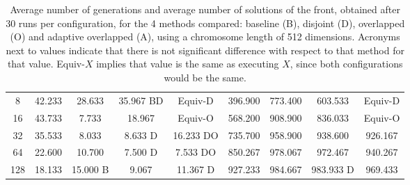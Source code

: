 \documentclass[preprint]{elsarticle}
\begin{document}
\begin{table*}
{\begin{tabular}{|c||c|c|c|c||c|c|c|c||}
8	&	42.233		&	28.633		&	35.967	BD		&	Equiv-D			&	396.900		&	773.400			&	603.533			&	Equiv-D				\\
16	&	43.733		&	7.733		&	18.967			&	Equiv-O			&	568.200		&	908.900			&	836.033			&	Equiv-O				\\
32	&	35.533		&	8.033		&	8.633	D		&	16.233		DO	&	735.700		&	958.900			&	938.600			&	926.167				\\
64	&	22.600		&	10.700		&	7.500	D		&	7.533		DO	&	850.267		&	978.067			&	972.467			&	940.267				\\
128	&	18.133		&	15.000	B	&	9.067			&	11.367		D	&	927.233		&	984.667			&	983.933	D		&	969.433				\\ \hline
\end{tabular}
}
\caption{Average number of generations and average number of solutions of the front, obtained after 30 runs per configuration, for the 4 methods compared: baseline (B), disjoint (D), overlapped (O) and adaptive overlapped (A), using a chromosome length of 512 dimensions. Acronyms next to values indicate that there is not significant difference with respect to that method for that value. Equiv-$X$ implies that value is the same as executing $X$, since both configurations would be the same.}
\label{tab:sols512}
\end{table*}
\end{document}
